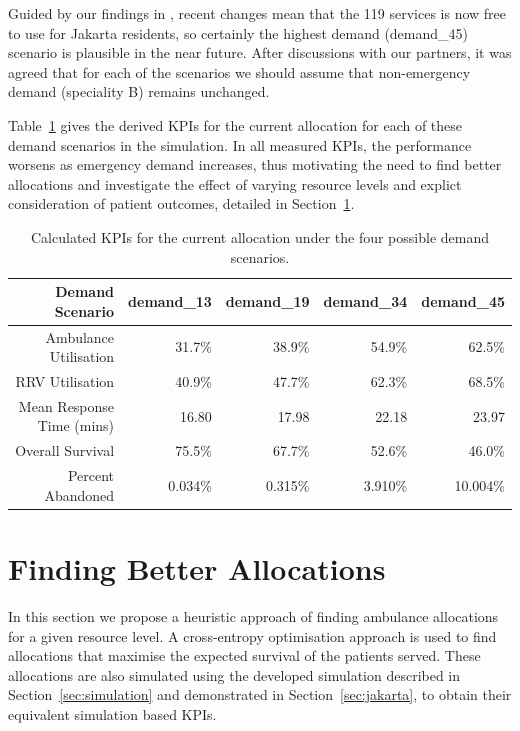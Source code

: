 \documentclass[preprint,12pt]{elsarticle}
\begin{document}
Guided by our findings in \cite{BriceSyaribahNoor2022Esui}, recent changes mean
that the 119 services is now free to use for Jakarta residents, so certainly the
highest demand (demand\_45) scenario is plausible in the near future.  After
discussions with our partners, it was agreed that for each of the scenarios we
should assume that non-emergency demand (speciality B) remains unchanged.  

Table~\ref{tbl:demand_results} gives the derived KPIs for the current allocation
for each of these demand scenarios in the simulation. In all measured KPIs, the
performance worsens as emergency demand increases, thus motivating the need to
find better allocations and investigate the effect of varying resource levels
and explict consideration of patient outcomes, detailed in
Section~\ref{sec:betterallocations}.

\begin{table} \begin{center} \small \begin{tabular}{rrrrr} \toprule Demand
    Scenario & \textbf{demand\_13} & \textbf{demand\_19} & \textbf{demand\_34} &
    \textbf{demand\_45} \\ \midrule Ambulance Utilisation & 31.7\% & 38.9\% &
    54.9\% & 62.5\% \\ RRV Utilisation & 40.9\% & 47.7\% & 62.3\% & 68.5\% \\
    Mean Response Time (mins) & 16.80 & 17.98 & 22.18 & 23.97 \\ Overall
    Survival & 75.5\% & 67.7\% & 52.6\% & 46.0\% \\ Percent Abandoned & 0.034\%
    & 0.315\% & 3.910\% & 10.004\% \\ \bottomrule \end{tabular}
    \caption{Calculated KPIs for the current allocation under the four possible
    demand scenarios.} \label{tbl:demand_results} \end{center} \end{table}


\section{Finding Better Allocations}\label{sec:betterallocations} In this
section we propose a heuristic approach of finding ambulance allocations for a
given resource level. A cross-entropy optimisation approach is used to find
allocations that maximise the expected survival of the patients served. These
allocations are also simulated using the developed simulation  described in
Section~\ref{sec:simulation} and demonstrated in Section~\ref{sec:jakarta}, to
obtain their equivalent simulation based KPIs.
\end{document}
